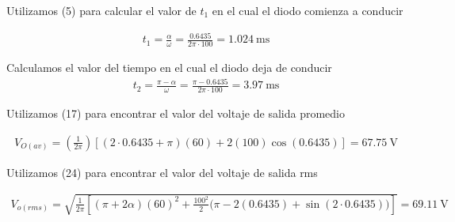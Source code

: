 \documentclass{article}
\begin{document}
\noindent Utilizamos (5) para calcular el valor de $t_1$ en el cual el diodo comienza a conducir

\begin{align}
	t_1 = \frac{\alpha}{\omega} = \frac{0.6435}{2\pi \cdot 100} = \qty{1.024}{\milli \second} \nonumber
\end{align}

\noindent Calculamos el valor del tiempo en el cual el diodo deja de conducir
\begin{align}
	t_2 = \frac{\pi - \alpha}{\omega} = \frac{\pi - 0.6435}{2\pi \cdot 100} = \qty{3.97}{\milli \second} \nonumber
\end{align}

\noindent Utilizamos (17) para encontrar el valor del voltaje de salida promedio

\begin{align}
	V_{O(av)} = \left( \frac{1}{2\pi} \right) \left[ (2 \cdot 0.6435 + \pi)(60) + 2(100)\cos(0.6435) \right] = \qty{67.75}{\volt} \nonumber
\end{align}

\noindent Utilizamos (24) para encontrar el valor del voltaje de salida rms

\begin{align}
	V_{o(rms)} =\sqrt{\frac{1}{2\pi} \left[ (\pi + 2\alpha)(60)^2 + \frac{100^2}{2}\bigg(\pi - 2(0.6435) + \sin(2\cdot0.6435)\bigg) \right] } = \qty{69.11}{\volt} \nonumber
\end{align}
\end{document}
